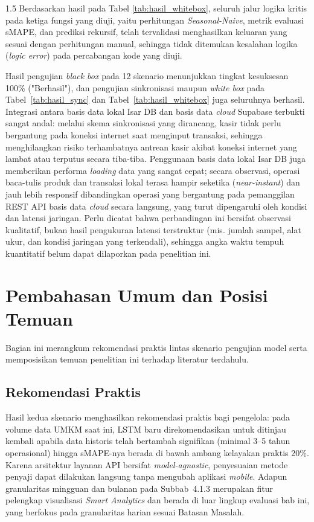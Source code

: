 \documentclass[12pt, a4paper, onecolumn, oneside]{report}
\begin{document}
\begin{spacing}{1.5}
Berdasarkan hasil pada Tabel \ref{tab:hasil_whitebox}, seluruh jalur logika kritis pada ketiga fungsi yang diuji, yaitu perhitungan \textit{Seasonal-Naive}, metrik evaluasi sMAPE, dan prediksi rekursif, telah tervalidasi menghasilkan keluaran yang sesuai dengan perhitungan manual, sehingga tidak ditemukan kesalahan logika (\textit{logic error}) pada percabangan kode yang diuji.

Hasil pengujian \textit{black box} pada 12 skenario menunjukkan tingkat kesuksesan 100\% ("Berhasil"), dan pengujian sinkronisasi maupun \textit{white box} pada Tabel~\ref{tab:hasil_sync} dan Tabel~\ref{tab:hasil_whitebox} juga seluruhnya berhasil. Integrasi antara basis data lokal Isar DB dan basis data \textit{cloud} Supabase terbukti sangat andal: melalui skema sinkronisasi yang dirancang, kasir tidak perlu bergantung pada koneksi internet saat menginput transaksi, sehingga menghilangkan risiko terhambatnya antrean kasir akibat koneksi internet yang lambat atau terputus secara tiba-tiba. Penggunaan basis data lokal Isar DB juga memberikan performa \textit{loading} data yang sangat cepat; secara observasi, operasi baca-tulis produk dan transaksi lokal terasa hampir seketika (\textit{near-instant}) dan jauh lebih responsif dibandingkan operasi yang bergantung pada pemanggilan REST API basis data \textit{cloud} secara langsung, yang turut dipengaruhi oleh kondisi dan latensi jaringan. Perlu dicatat bahwa perbandingan ini bersifat observasi kualitatif, bukan hasil pengukuran latensi terstruktur (mis. jumlah sampel, alat ukur, dan kondisi jaringan yang terkendali), sehingga angka waktu tempuh kuantitatif belum dapat dilaporkan pada penelitian ini.

\section{Pembahasan Umum dan Posisi Temuan}

Bagian ini merangkum rekomendasi praktis lintas skenario pengujian model serta memposisikan temuan penelitian ini terhadap literatur terdahulu.

\subsection{Rekomendasi Praktis}
Hasil kedua skenario menghasilkan rekomendasi praktis bagi pengelola: pada volume data UMKM saat ini, LSTM baru direkomendasikan untuk ditinjau kembali apabila data historis telah bertambah signifikan (minimal 3--5 tahun operasional) hingga sMAPE-nya berada di bawah ambang kelayakan praktis 20\%. Karena arsitektur layanan API bersifat \textit{model-agnostic}, penyesuaian metode penyaji dapat dilakukan langsung tanpa mengubah aplikasi \textit{mobile}. Adapun granularitas mingguan dan bulanan pada Subbab~4.1.3 merupakan fitur pelengkap visualisasi \textit{Smart Analytics} dan berada di luar lingkup evaluasi bab ini, yang berfokus pada granularitas harian sesuai Batasan Masalah.


\end{spacing}
\end{document}
